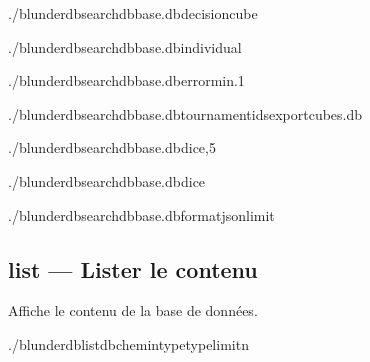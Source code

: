 \documentclass[letterpaper,10pt,french]{sphinxmanual}
\begin{document}
\sphinxAtStartPar
{}

\begin{sphinxVerbatim}[commandchars=\\\{\}]
./blunderdbsearch\PYGZhy{}\PYGZhy{}dbbase.db\PYGZhy{}\PYGZhy{}decisioncube

./blunderdbsearch\PYGZhy{}\PYGZhy{}dbbase.db\PYGZhy{}\PYGZhy{}individual

./blunderdbsearch\PYGZhy{}\PYGZhy{}dbbase.db\PYGZhy{}\PYGZhy{}error\PYGZhy{}min.1

./blunderdbsearch\PYGZhy{}\PYGZhy{}dbbase.db\PYGZhy{}\PYGZhy{}tournament\PYGZhy{}ids\PYGZhy{}\PYGZhy{}exportcubes.db

./blunderdbsearch\PYGZhy{}\PYGZhy{}dbbase.db\PYGZhy{}\PYGZhy{}dice,5

./blunderdbsearch\PYGZhy{}\PYGZhy{}dbbase.db\PYGZhy{}\PYGZhy{}dice

./blunderdbsearch\PYGZhy{}\PYGZhy{}dbbase.db\PYGZhy{}\PYGZhy{}formatjson\PYGZhy{}\PYGZhy{}limit
\end{sphinxVerbatim}


\subsection{list — Lister le contenu}
\label{\detokenize{cli:list-lister-le-contenu}}
\sphinxAtStartPar
Affiche le contenu de la base de données.

\begin{sphinxVerbatim}[commandchars=\\\{\}]
./blunderdblist\PYGZhy{}\PYGZhy{}db\PYGZlt{}chemin\PYGZgt{}\PYGZhy{}\PYGZhy{}type\PYGZlt{}type\PYGZgt{}\PYG{o}{[}\PYGZhy{}\PYGZhy{}limit\PYGZlt{}n\PYGZgt{}\PYG{o}{]}
\end{sphinxVerbatim}
\end{document}
